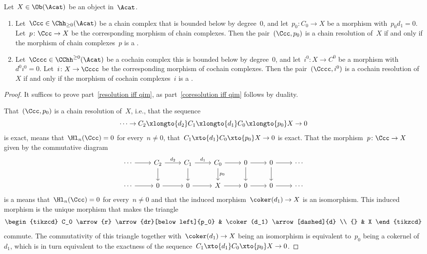 \begin{lemma}
  Let~$X \in \Ob(\Acat)$ be an object in~$\Acat$.
  \begin{enumerate}
    \item
      \label{resolution iff qim}
      Let~$\Ccc \in \Chh_{\geq 0}(\Acat)$ be a chain complex that is bounded below by degree~$0$, and let~$p_0 \colon C_0 \to X$ be a morphism with~$p_0 d_1 = 0$.
      Let~$p \colon \Ccc \to X$ be the corresponding morphism of chain complexes.
      Then the pair~$(\Ccc, p_0)$ is a chain resolution of~$X$ if and only if the morphism of chain complexes~$p$ is a {\qim}.
    \item
      \label{coresolution iff qim}
      Let~$\Cccc \in \CChh^{\geq 0}(\Acat)$ be a cochain complex this is bounded below by degree~$0$, and let~$i^0 \colon X \to C^0$ be a morphism with~$d^0 i^0 = 0$.
      Let~$i \colon X \to \Cccc$ be the corresponding morphism of cochain complexes.
      Then the pair~$(\Cccc, i^0)$ is a cochain resolution of~$X$ if and only if the morphism of cochain complexes~$i$ is a {\qim}.
  \end{enumerate}
\end{lemma}


\begin{proof}
  It suffices to prove part~\ref*{resolution iff qim}, as part~\ref*{coresolution iff qim} follows by duality.
  
  That~$(\Ccc, p_0)$ is a chain resolution of~$X$, i.e., that the sequence
  \[
    \dotsb
    \to
    C_2
    \xlongto{d_2}
    C_1
    \xlongto{d_1}
    C_0
    \xlongto{p_0}
    X
    \to
    0
  \]
  is exact, means that~$\Hl_n(\Ccc) = 0$ for every~$n \neq 0$, that~$C_1 \xto{d_1} C_0 \xto{p_0} X \to 0$ is exact.
  That the morphism~$p \colon \Ccc \to X$ given by the commutative diagram
  \[
    \begin{tikzcd}
        \dotsb
        \arrow{r}
      & C_2
        \arrow{r}[above]{d_2}
        \arrow{d}
      & C_1
        \arrow{r}[above]{d_1}
        \arrow{d}
      & C_0
        \arrow{r}
        \arrow{d}[right]{p_0}
      & 0
        \arrow{r}
        \arrow{d}
      & 0
        \arrow{r}
        \arrow{d}
      & \dotsb
      \\
        \dotsb
        \arrow{r}
      & 0
        \arrow{r}
      & 0
        \arrow{r}
      & X
        \arrow{r}
      & 0
        \arrow{r}
      & 0
        \arrow{r}
      & \dotsb
    \end{tikzcd}
  \]
  is a {\qim} means that~$\Hl_n(\Ccc) = 0$ for every~$n \neq 0$ and that the induced morphism~$\coker(d_1) \to X$ is an isomorphism.
  This induced morphism is the unique morphism that makes the triangle
  \[
    \begin{tikzcd}
        C_0
        \arrow{r}
        \arrow{dr}[below left]{p_0}
      & \coker(d_1)
        \arrow[dashed]{d}
      \\
        {}
      & X
    \end{tikzcd}
  \]
  commute.
  The commutativity of this triangle together with~$\coker(d_1) \to X$ being an isomorphism is equivalent to~$p_0$ being a cokernel of~$d_1$, which is in turn equivalent to the exactness of the sequence~$C_1 \xto{d_1} C_0 \xto{p_0} X \to 0$.
\end{proof}


